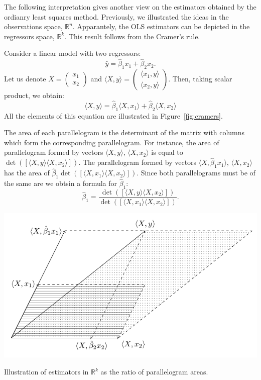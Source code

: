 The following interpretation gives another view on the estimators obtained
by the ordianry least squares method.
Previously, we illustrated the ideas in the observations space, $\mathbb{R}^n$.
Apparantely, the OLS estimators can be depicted in the regressors space, $\mathbb{R}^k$.
This result follows from the Cramer's rule.

Consider a linear model with two regressors:
\[
\hat y = \hat \beta_1 x_1 + \hat \beta_2 x_2.
\]
Let us denote $X = \begin{pmatrix} x_1 \\ x_2 \end{pmatrix}$ and
$\langle X, y \rangle = \begin{pmatrix} \langle x_1,  y \rangle \\
\langle x_2,  y \rangle \end{pmatrix}$.
Then, taking scalar product, we obtain:
\[
\langle X, y \rangle = \hat \beta_1 \langle X, x_1 \rangle + \hat \beta_2 \langle X, x_2 \rangle
\]
All the elements of this equation are illustrated in Figure~\ref{fig:cramers}.

The area of each parallelogram is the determinant of the matrix with columns
which form the corresponding parallelogram.
For instance, the area of parallelogram formed by vectors $\langle X, y \rangle$, $\langle X, x_2 \rangle$
is equal to $\det([\langle X, y \rangle  \langle X,  x_2 \rangle])$.
The parallelogram formed by vectors $\langle X, \hat \beta_1 x_1 \rangle$,
$\langle X, x_2 \rangle$ has the area of $\hat \beta_1 \det([\langle X, x_1 \rangle  \langle X, x_2 \rangle])$.
Since both parallelograms must be of the same are we obtsin a formula for $\hat \beta_1$:
\[
\hat \beta_1 = \frac{\det([\langle X, y \rangle  \langle X,  x_2 \rangle])}{ \det([\langle X, x_1 \rangle  \langle X, x_2 \rangle])}.
\]

\begin{marginfigure}
  \includegraphics[scale=0.5]{figures/02_cramers_rule.pdf}
  \label{fig:cramers}
  \caption{Illustration of estimators in $\mathbb{R}^k$ as the ratio of parallelogram areas.}
\end{marginfigure}

